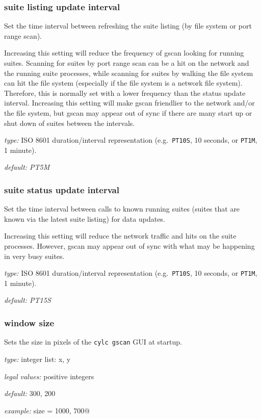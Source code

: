 \subsubsection{suite listing update interval}

Set the time interval between refreshing the suite listing (by file system or
port range scan).

Increasing this setting will reduce the frequency of gscan looking for running
suites. Scanning for suites by port range scan can be a hit on the network and
the running suite processes, while scanning for suites by walking the file
system can hit the file system (especially if the file system is a network file
system). Therefore, this is normally set with a lower frequency than the status
update interval. Increasing this setting will make gscan friendlier to the
network and/or the file system, but gscan may appear out of sync if there are
many start up or shut down of suites between the intervals.

\begin{myitemize}
\item {\em type:} ISO 8601 duration/interval representation (e.g.\ 
\lstinline=PT10S=, 10 seconds, or \lstinline=PT1M=, 1 minute).
\item {\em default: PT5M}
\end{myitemize}

\subsubsection{suite status update interval}

Set the time interval between calls to known running suites (suites that are
known via the latest suite listing) for data updates.

Increasing this setting will reduce the network traffic and hits on the suite
processes. However, gscan may appear out of sync with what may be happening
in very busy suites.

\begin{myitemize}
\item {\em type:} ISO 8601 duration/interval representation (e.g.\ 
\lstinline=PT10S=, 10 seconds, or \lstinline=PT1M=, 1 minute).
\item {\em default: PT15S}
\end{myitemize}

\subsubsection{window size}

Sets the size in pixels of the \lstinline=cylc gscan= GUI at startup.

\begin{myitemize}
    \item {\em type:} integer list: x, y
    \item {\em legal values:} positive integers
    \item {\em default:} 300, 200
    \item {\em example:} \lstinline@window size = 1000, 700@
\end{myitemize}
